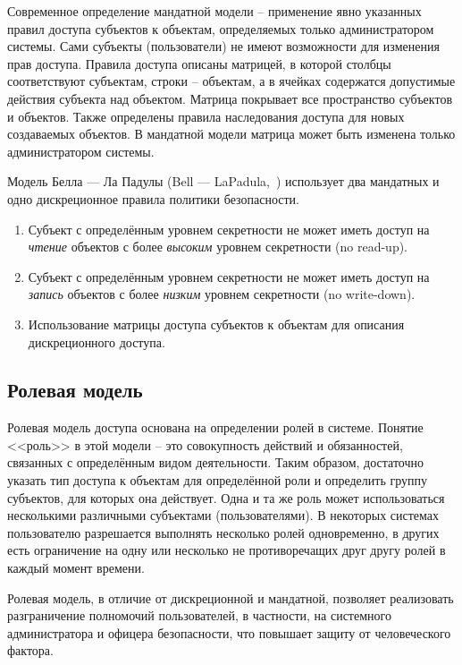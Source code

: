 Современное определение мандатной модели -- применение явно указанных правил доступа субъектов к объектам, определяемых только администратором системы. Сами субъекты (пользователи) не имеют возможности для изменения прав доступа. Правила доступа описаны матрицей, в которой столбцы соответствуют субъектам, строки -- объектам, а в ячейках содержатся допустимые действия субъекта над объектом. Матрица покрывает все пространство субъектов и объектов. Также определены правила наследования доступа для новых создаваемых объектов. В мандатной модели матрица может быть изменена только администратором системы.

Модель Белла --- Ла Падулы (Bell --- LaPadula,~\cite{Bell:LaPadula:1973, Bell:LaPadula:1976}) использует два мандатных и одно дискреционное правила политики безопасности.
\begin{enumerate}
    \item Субъект с определённым уровнем секретности не может иметь доступ на \emph{чтение} объектов с более \emph{высоким} уровнем секретности (no read-up).
    \item Субъект с определённым уровнем секретности не может иметь доступ на \emph{запись} объектов с более \emph{низким} уровнем секретности (no write-down).
    \item Использование матрицы доступа субъектов к объектам для описания дискреционного доступа.
\end{enumerate}

\subsection{Ролевая модель}

Ролевая модель доступа основана на определении ролей в системе. Понятие <<роль>> в этой модели -- это совокупность действий и обязанностей, связанных с определённым видом деятельности. Таким образом, достаточно указать тип доступа к объектам для определённой роли и определить группу субъектов, для которых она действует.
Одна и та же роль может использоваться несколькими различными субъектами (пользователями). В некоторых системах пользователю разрешается выполнять несколько ролей одновременно, в других есть ограничение на одну или несколько не противоречащих друг другу ролей в каждый момент времени.

Ролевая модель, в отличие от дискреционной и мандатной, позволяет реализовать разграничение полномочий пользователей, в частности, на системного администратора и офицера безопасности, что повышает защиту от человеческого фактора.
